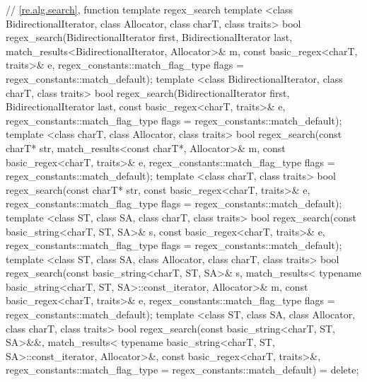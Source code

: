 \begin{codeblock}
{  // \ref{re.alg.search}, function template regex_search
  template <class BidirectionalIterator, class Allocator,
      class charT, class traits>
    bool regex_search(BidirectionalIterator first, BidirectionalIterator last,
                      match_results<BidirectionalIterator, Allocator>& m,
                      const basic_regex<charT, traits>& e,
                      regex_constants::match_flag_type flags =
                        regex_constants::match_default);
  template <class BidirectionalIterator, class charT, class traits>
    bool regex_search(BidirectionalIterator first, BidirectionalIterator last,
                      const basic_regex<charT, traits>& e,
                      regex_constants::match_flag_type flags =
                        regex_constants::match_default);
  template <class charT, class Allocator, class traits>
    bool regex_search(const charT* str,
                      match_results<const charT*, Allocator>& m,
                      const basic_regex<charT, traits>& e,
                      regex_constants::match_flag_type flags =
                        regex_constants::match_default);
  template <class charT, class traits>
    bool regex_search(const charT* str,
                      const basic_regex<charT, traits>& e,
                      regex_constants::match_flag_type flags =
                        regex_constants::match_default);
  template <class ST, class SA, class charT, class traits>
    bool regex_search(const basic_string<charT, ST, SA>& s,
                      const basic_regex<charT, traits>& e,
                      regex_constants::match_flag_type flags =
                        regex_constants::match_default);
  template <class ST, class SA, class Allocator, class charT, class traits>
    bool regex_search(const basic_string<charT, ST, SA>& s,
                      match_results<
                        typename basic_string<charT, ST, SA>::const_iterator,
                        Allocator>& m,
                      const basic_regex<charT, traits>& e,
                      regex_constants::match_flag_type flags =
                        regex_constants::match_default);
  template <class ST, class SA, class Allocator, class charT, class traits>
    bool regex_search(const basic_string<charT, ST, SA>&&,
                      match_results<
                        typename basic_string<charT, ST, SA>::const_iterator,
                        Allocator>&,
                      const basic_regex<charT, traits>&,
                      regex_constants::match_flag_type =
                        regex_constants::match_default) = delete;

}
\end{codeblock}
